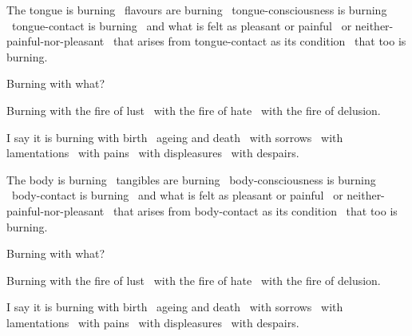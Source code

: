 \begin{english-only-hang}
  The tongue is burning \breathmark\ flavours are burning \breathmark\ tongue-consciousness is burning \breathmark\ tongue-contact is burning \breathmark\ and what is felt as pleasant or painful \breathmark\ or neither-painful-nor-pleasant \breathmark\ that arises from tongue-contact as its condition \breathmark\ that too is burning.
\end{english-only-hang}
\begin{english-only-hangtogether}
  Burning with what?
\end{english-only-hangtogether}
\begin{english-only-hangtogether}
  Burning with the fire of lust \breathmark\ with the fire of hate \breathmark\ with the fire of delusion.
\end{english-only-hangtogether}
\begin{english-only-hangtogether}
  I say it is burning with birth \breathmark\ ageing and death \breathmark\ with sorrows \breathmark\ with lamentations \breathmark\ with pains \breathmark\ with displeasures \breathmark\ with despairs.
\end{english-only-hangtogether}

\begin{english-only-hang}
  The body is burning \breathmark\ tangibles are burning \breathmark\ body-consciousness is burning \breathmark\ body-contact is burning \breathmark\ and what is felt as pleasant or painful \breathmark\ or neither-painful-nor-pleasant \breathmark\ that arises from body-contact as its condition \breathmark\ that too is burning.
\end{english-only-hang}
\begin{english-only-hangtogether}
  Burning with what?
\end{english-only-hangtogether}
\begin{english-only-hangtogether}
  Burning with the fire of lust \breathmark\ with the fire of hate \breathmark\ with the fire of delusion.
\end{english-only-hangtogether}
\begin{english-only-hangtogether}
  I say it is burning with birth \breathmark\ ageing and death \breathmark\ with sorrows \breathmark\ with lamentations \breathmark\ with pains \breathmark\ with displeasures \breathmark\ with despairs.
\end{english-only-hangtogether}

